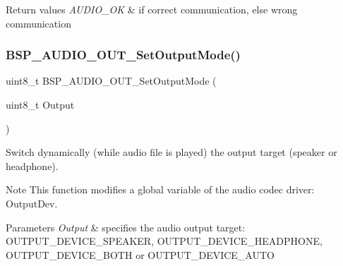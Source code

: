 \begin{DoxyRetVals}{Return values}
{\em A\+U\+D\+I\+O\+\_\+\+OK} & if correct communication, else wrong communication \\
\hline
\end{DoxyRetVals}
\mbox{\label{group___s_t_m32_f4___d_i_s_c_o_v_e_r_y___a_u_d_i_o___o_u_t___private___functions_gacd0d9e6eb0ff2569cf6c4b92fc359484}} 
\subsubsection{\texorpdfstring{B\+S\+P\+\_\+\+A\+U\+D\+I\+O\+\_\+\+O\+U\+T\+\_\+\+Set\+Output\+Mode()}{BSP\_AUDIO\_OUT\_SetOutputMode()}}
{\footnotesize\ttfamily uint8\+\_\+t B\+S\+P\+\_\+\+A\+U\+D\+I\+O\+\_\+\+O\+U\+T\+\_\+\+Set\+Output\+Mode (\begin{DoxyParamCaption}\item[{uint8\+\_\+t}]{Output }\end{DoxyParamCaption})}



Switch dynamically (while audio file is played) the output target (speaker or headphone). 

\begin{DoxyNote}{Note}
This function modifies a global variable of the audio codec driver\+: Output\+Dev. 
\end{DoxyNote}

\begin{DoxyParams}{Parameters}
{\em Output} & specifies the audio output target\+: O\+U\+T\+P\+U\+T\+\_\+\+D\+E\+V\+I\+C\+E\+\_\+\+S\+P\+E\+A\+K\+ER, O\+U\+T\+P\+U\+T\+\_\+\+D\+E\+V\+I\+C\+E\+\_\+\+H\+E\+A\+D\+P\+H\+O\+NE, O\+U\+T\+P\+U\+T\+\_\+\+D\+E\+V\+I\+C\+E\+\_\+\+B\+O\+TH or O\+U\+T\+P\+U\+T\+\_\+\+D\+E\+V\+I\+C\+E\+\_\+\+A\+U\+TO \\
\hline
\end{DoxyParams}

